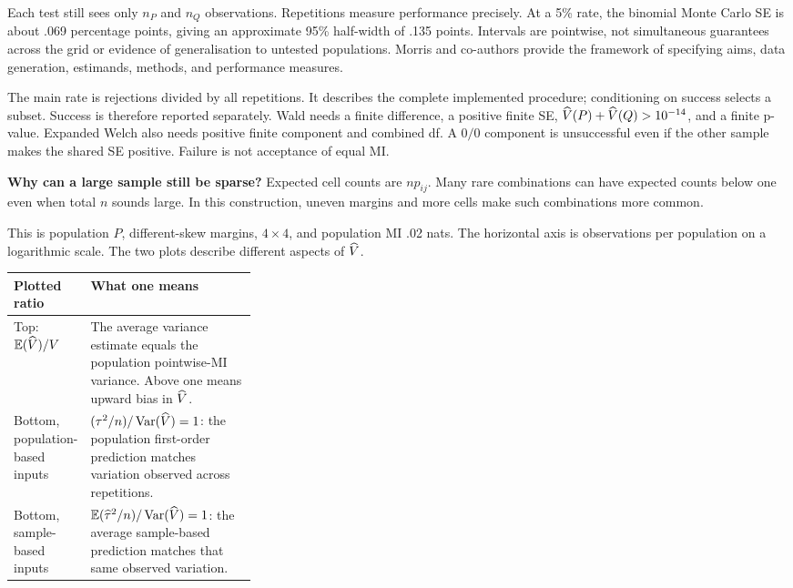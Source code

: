 Each test still sees only \(n_P\) and \(n_Q\) observations. Repetitions measure performance precisely. At a 5\% rate, the binomial Monte Carlo SE is about .069 percentage points, giving an approximate 95\% half-width of .135 points. Intervals are pointwise, not simultaneous guarantees across the grid or evidence of generalisation to untested populations. Morris and co-authors provide the framework of specifying aims, data generation, estimands, methods, and performance measures.

The main rate is rejections divided by all repetitions. It describes the complete implemented procedure; conditioning on success selects a subset. Success is therefore reported separately. Wald needs a finite difference, a positive finite SE, \(\widehat V(P)+\widehat V(Q)>10^{-14}\), and a finite p-value. Expanded Welch also needs positive finite component and combined df. A \(0/0\) component is unsuccessful even if the other sample makes the shared SE positive. Failure is not acceptance of equal MI.

\textbf{Why can a large sample still be sparse?} Expected cell counts are \(np_{ij}\). Many rare combinations can have expected counts below one even when total \(n\) sounds large. In this construction, uneven margins and more cells make such combinations more common.

\newpage
{}

This is population \(P\), different-skew margins, \(4\times4\), and population MI .02 nats. The horizontal axis is observations per population on a logarithmic scale. The two plots describe different aspects of \(\widehat V\).

\begin{tabularx}{\linewidth}{@{}p{0.31\linewidth}X@{}}
\toprule
\textbf{Plotted ratio} & \textbf{What one means}\\
\midrule
Top: \(\mathbb E(\widehat V)/V\) & The average variance estimate equals the population pointwise-MI variance. Above one means upward bias in \(\widehat V\).\\
Bottom, population-based inputs & \((\tau^2/n)/\operatorname{Var}(\widehat V)=1\): the population first-order prediction matches variation observed across repetitions.\\
Bottom, sample-based inputs & \(\mathbb E(\widehat\tau^2/n)/\operatorname{Var}(\widehat V)=1\): the average sample-based prediction matches that same observed variation.\\
\bottomrule
\end{tabularx}

